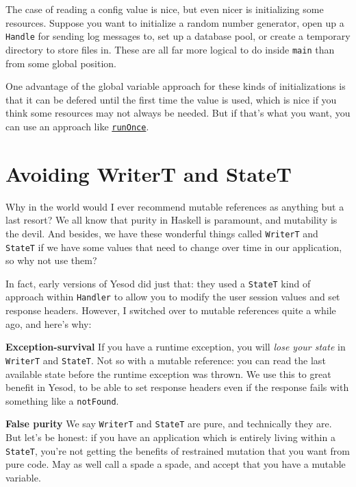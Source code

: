 The case of reading a config value is nice, but even nicer is
initializing some resources. Suppose you want to initialize a random
number generator, open up a \texttt{Handle} for sending log messages to,
set up a database pool, or create a temporary directory to store files
in. These are all far more logical to do inside \texttt{main} than from
some global position.

One advantage of the global variable approach for these kinds of
initializations is that it can be defered until the first time the value
is used, which is nice if you think some resources may not always be
needed. But if that's what you want, you can use an approach like
\href{https://github.com/commercialhaskell/stack/blob/master/src/Data/IORef/RunOnce.hs}{\texttt{runOnce}}.

\section{Avoiding WriterT and StateT}

Why in the world would I ever recommend mutable references as anything
but a last resort? We all know that purity in Haskell is paramount, and
mutability is the devil. And besides, we have these wonderful things
called \texttt{WriterT} and \texttt{StateT} if we have some values that
need to change over time in our application, so why not use them?

In fact, early versions of Yesod did just that: they used a
\texttt{StateT} kind of approach within \texttt{Handler} to allow you to
modify the user session values and set response headers. However, I
switched over to mutable references quite a while ago, and here's why:

\textbf{Exception-survival} If you have a runtime exception, you will
\emph{lose your state} in \texttt{WriterT} and \texttt{StateT}. Not so
with a mutable reference: you can read the last available state before
the runtime exception was thrown. We use this to great benefit in Yesod,
to be able to set response headers even if the response fails with
something like a \texttt{notFound}.

\textbf{False purity} We say \texttt{WriterT} and \texttt{StateT} are
pure, and technically they are. But let's be honest: if you have an
application which is entirely living within a \texttt{StateT}, you're
not getting the benefits of restrained mutation that you want from pure
code. May as well call a spade a spade, and accept that you have a
mutable variable.

